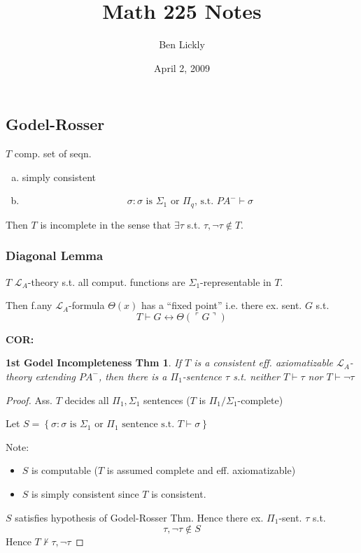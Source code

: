 \documentclass[12pt]{article}
\author{Ben Lickly}
\date{April 2, 2009}
\title{Math 225 Notes}
\newcommand{\proves}{\vdash}
\newcommand{\gn}[1]{\ulcorner #1 \urcorner}
\begin{document}
\maketitle

\subsection*{Godel-Rosser}
$T$ comp. set of seqn.
\begin{enumerate}[(a)]
  \item simply consistent
  \item \[
    \sigma : \sigma \text{ is $\Sigma_1$ or $\Pi_q$, s.t. } PA^- \proves \sigma
    \]
\end{enumerate}
Then $T$ is incomplete in the sense that $\exists\tau$ 
s.t. $\tau, \neg\tau \not\in T$.

\subsubsection*{Diagonal Lemma}
$T$ $\mathcal{L}_A$-theory s.t. all comput. functions are
$\Sigma_1$-representable in $T$.

Then f.any $\mathcal{L}_A$-formula  $\Theta(x)$ has a ``fixed point''
%
i.e. there ex. sent. $G$ s.t.
\[
T \proves G \leftrightarrow \Theta(\gn{G})
\]

\textbf{COR:}
\newtheorem*{firstincomp}{1st Godel Incompleteness Thm}
\begin{firstincomp}
  If $T$ is a consistent eff. axiomatizable $\mathcal{L}_A$-theory extending
  $PA^-$, then there is a $\Pi_1$-sentence $\tau$ s.t.
  neither $T \proves \tau$ nor $T \proves \neg\tau$
\end{firstincomp}
\begin{proof}
  Ass. $T$ decides all $\Pi_1,\Sigma_1$ sentences
               ($T$ is $\Pi_1/\Sigma_1$-complete)

  Let $S = \left\{ \sigma : \sigma \text{ is $\Sigma_1$ or $\Pi_1$ sentence s.t. } T \proves \sigma \right\}$

  Note:
  \begin{itemize}
    \item $S$ is computable ($T$ is assumed complete and eff. axiomatizable)
    \item $S$ is simply consistent since $T$ is consistent.
  \end{itemize}

  $S$ satisfies hypothesis of Godel-Rosser Thm.
  Hence there ex. $\Pi_1$-sent. $\tau$ s.t.
  \[
        \tau, \neg\tau \not\in S
  \]
  Hence $T \not\proves \tau, \neg\tau$
\end{proof}
\end{document}
